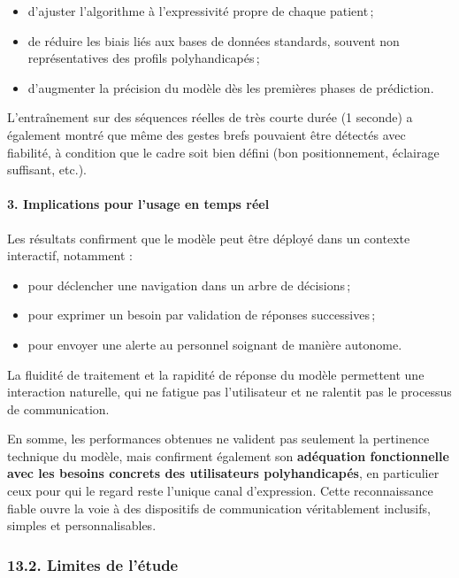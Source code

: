 \documentclass[
]{article}
\begin{document}
\begin{itemize}
\item
  d'ajuster l'algorithme à l'expressivité propre de chaque patient\,;
\item
  de réduire les biais liés aux bases de données standards, souvent non représentatives des profils polyhandicapés\,;
\item
  d'augmenter la précision du modèle dès les premières phases de prédiction.
\end{itemize}

L'entraînement sur des séquences réelles de très courte durée (1 seconde) a également montré que même des gestes brefs pouvaient être détectés avec fiabilité, à condition que le cadre soit bien défini (bon positionnement, éclairage suffisant, etc.).

\hypertarget{implications-pour-lusage-en-temps-ruxe9el}{%
\paragraph{\texorpdfstring{\textbf{3. Implications pour l'usage en temps réel}}{3. Implications pour l'usage en temps réel}}\label{implications-pour-lusage-en-temps-ruxe9el}}

Les résultats confirment que le modèle peut être déployé dans un contexte interactif, notamment :

\begin{itemize}
\item
  pour déclencher une navigation dans un arbre de décisions\,;
\item
  pour exprimer un besoin par validation de réponses successives\,;
\item
  pour envoyer une alerte au personnel soignant de manière autonome.
\end{itemize}

La fluidité de traitement et la rapidité de réponse du modèle permettent une interaction naturelle, qui ne fatigue pas l'utilisateur et ne ralentit pas le processus de communication.

En somme, les performances obtenues ne valident pas seulement la pertinence technique du modèle, mais confirment également son \textbf{adéquation fonctionnelle avec les besoins concrets des utilisateurs polyhandicapés}, en particulier ceux pour qui le regard reste l'unique canal d'expression. Cette reconnaissance fiable ouvre la voie à des dispositifs de communication véritablement inclusifs, simples et personnalisables.

\hypertarget{limites-de-luxe9tude}{%
\subsubsection{13.2. Limites de l'étude}\label{limites-de-luxe9tude}}
\end{document}
